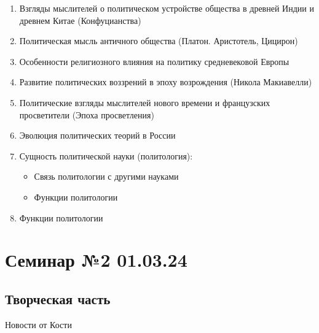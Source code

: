 \begin{enumerate}
  \item Взгляды мыслителей о политическом устройстве общества в древней Индии и древнем Китае (Конфуцианства)
  \item Политическая мысль античного общества (Платон. Аристотель, Цицирон)
  \item Особенности религиозного влияния на политику средневековой Европы
  \item Развитие политических воззрений в эпоху возрождения (Никола Макиавелли)
  \item Политические взгляды мыслителей нового времени и французских просветители (Эпоха просветления)
  \item Эволюция политических теорий в России
  \item Сущность политической науки (политология):
        \begin{itemize}
          \item Связь политологии с другими науками
          \item Функции политологии
        \end{itemize}
  \item Функции политологии
\end{enumerate}

\chapter{Семинар №2 01.03.24}

\section{Творческая часть}

Новости от Кости